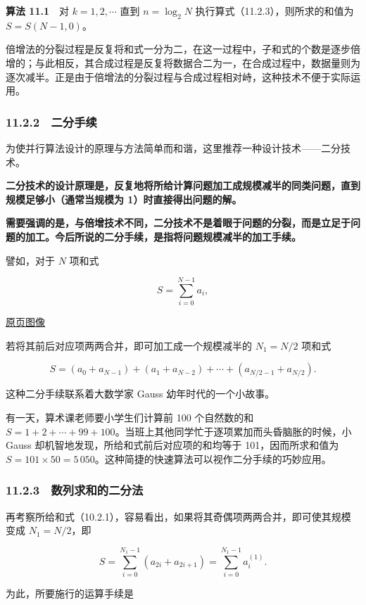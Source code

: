 \documentclass[
  10pt,
  fontset=fandol]{ctexart}
\begin{document}
\textbf{算法 11.1}　对 \(k=1,2,\cdots\) 直到 \(n=\log_2 N\) 执行算式（11.2.3），则所求的和值为 \(S=S(N-1,0)\)。

倍增法的分裂过程是反复将和式一分为二，在这一过程中，子和式的个数是逐步倍增的；与此相反，其合成过程是反复将数据合二为一，在合成过程中，数据量则为逐次减半。正是由于倍增法的分裂过程与合成过程相对峙，这种技术不便于实际运用。

\subsubsection{11.2.2　二分手续}\label{ux4e8cux5206ux624bux7eed}

为使并行算法设计的原理与方法简单而和谐，这里推荐一种设计技术------二分技术。

\textbf{二分技术的设计原理是，反复地将所给计算问题加工成规模减半的同类问题，直到规模足够小（通常当规模为 1）时直接得出问题的解。}

\textbf{需要强调的是，与倍增技术不同，二分技术不是着眼于问题的分裂，而是立足于问题的加工。今后所说的二分手续，是指将问题规模减半的加工手续。}

譬如，对于 \(N\) 项和式

\[
S=\sum_{i=0}^{N-1}a_i,
\]

\href{../../source-images/pdf-281.jpeg}{原页图像}

若将其前后对应项两两合并，即可加工成一个规模减半的 \(N_1=N/2\) 项和式

\[
S=(a_0+a_{N-1})+(a_1+a_{N-2})+\cdots+(a_{N/2-1}+a_{N/2}).
\]

这种二分手续联系着大数学家 Gauss 幼年时代的一个小故事。

有一天，算术课老师要小学生们计算前 100 个自然数的和 \(S=1+2+\cdots+99+100\)。当班上其他同学忙于逐项累加而头昏脑胀的时候，小 Gauss 却机智地发现，所给和式前后对应项的和均等于 101，因而所求和值为 \(S=101\times50=5\,050\)。这种简捷的快速算法可以视作二分手续的巧妙应用。

\subsubsection{11.2.3　数列求和的二分法}\label{ux6570ux5217ux6c42ux548cux7684ux4e8cux5206ux6cd5}

再考察所给和式（10.2.1），容易看出，如果将其奇偶项两两合并，即可使其规模变成 \(N_1=N/2\)，即

\[
S=\sum_{i=0}^{N_1-1}(a_{2i}+a_{2i+1})=\sum_{i=0}^{N_1-1}a_i^{(1)}.
\]

为此，所要施行的运算手续是
\end{document}
